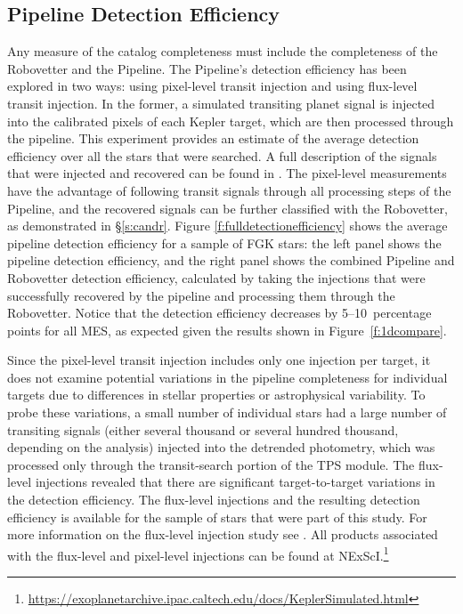 \subsection{Pipeline Detection Efficiency}

Any measure of the catalog completeness must include the completeness of the Robovetter and the \Kepler{} Pipeline. The Pipeline's detection efficiency has been explored in two ways: using pixel-level transit injection and using flux-level transit injection. In the former, a simulated transiting planet signal is injected into the calibrated pixels of each Kepler target, which are then processed through the pipeline. This experiment provides an estimate of the average detection efficiency over all the stars that were searched. A full description of the signals that were injected and recovered can be found in \citet{Christiansen2017}. The pixel-level measurements have the advantage of following transit signals through all processing steps of the \Kepler{} Pipeline, and the recovered signals can be further classified with the Robovetter, as demonstrated in \S\ref{s:candr}. Figure \ref{f:fulldetectionefficiency} shows the average pipeline detection efficiency for a sample of FGK stars: the left panel shows the pipeline detection efficiency, and the right panel shows the combined Pipeline and Robovetter detection efficiency, calculated by taking the injections that were successfully recovered by the pipeline and processing them through the Robovetter. Notice that the detection efficiency decreases by 5--10~percentage points for all MES, as expected given the results shown in Figure~\ref{f:1dcompare}.


Since the pixel-level transit injection includes only one injection per target, it does not examine potential variations in the pipeline completeness for individual targets due to differences in stellar properties or astrophysical variability. To probe these variations, a small number of individual stars had a large number of transiting signals (either several thousand or several hundred thousand, depending on the analysis) injected into the detrended photometry, which was processed only through the transit-search portion of the TPS module. The flux-level injections revealed that there are significant target-to-target variations in the detection efficiency. The flux-level injections and the resulting detection efficiency is available for the sample of stars that were part of this study. For more information on the flux-level injection study see \citet{Burke2017c}. All products associated with the flux-level and pixel-level injections can be found at NExScI.\footnote{\url{https://exoplanetarchive.ipac.caltech.edu/docs/KeplerSimulated.html}}


